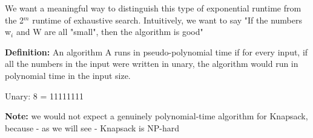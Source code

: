 \documentclass[openany]{article}
\begin{document}
\begin{solution*}{}
        We want a meaningful way to distinguish this type of exponential runtime from the 2$^m$ runtime of exhaustive search. Intuitively, we want to say "If the numbers w$_i$ and W are all "small", then the algorithm is good"
        
        \textbf{Definition:} An algorithm A runs in pseudo-polynomial time if for every input, if all the numbers in the input were written in unary, the algorithm would run in polynomial time in the input size.
        
        Unary: 8 = 11111111
        
        \textbf{Note:} we would not expect a genuinely polynomial-time algorithm for Knapsack, because - as we will see - Knapsack is NP-hard
\end{solution*}

\end{document}
